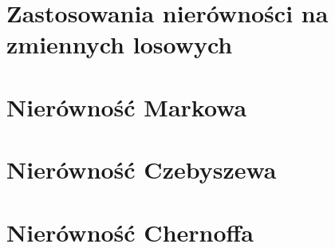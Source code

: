 \section{Zastosowania nierówności na zmiennych losowych}


\newpage
\section{Nierówność Markowa}


\newpage
\section{Nierówność Czebyszewa}


\newpage
\section{Nierówność Chernoffa}


